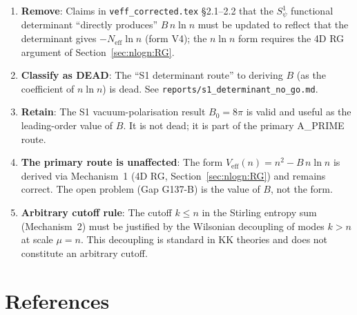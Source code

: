 \documentclass[12pt,a4paper]{article}
\theoremstyle{definition}
\theoremstyle{remark}
\newcommand{\Neff}{N_{\mathrm{eff}}}
\begin{document}
\begin{enumerate}
  \item \textbf{Remove}: Claims in \texttt{veff\_corrected.tex} \S2.1--2.2
        that the $S^1_\psi$ functional determinant ``directly produces''
        $B\,n\ln n$ must be updated to reflect that the determinant gives
        $-\Neff\ln n$ (form V4); the $n\ln n$ form requires the 4D RG
        argument of Section~\ref{sec:nlogn:RG}.

  \item \textbf{Classify as DEAD}: The ``S1 determinant route'' to deriving
        $B$ (as the coefficient of $n\ln n$) is dead.  See
        \texttt{reports/s1\_determinant\_no\_go.md}.

  \item \textbf{Retain}: The S1 vacuum-polarisation result $B_0 = 8\pi$ is
        valid and useful as the leading-order value of $B$.  It is not dead;
        it is part of the primary A\_PRIME route.

  \item \textbf{The primary route is unaffected}: The form
        $V_\mathrm{eff}(n) = n^2 - B\,n\ln n$ is derived via Mechanism~1
        (4D RG, Section~\ref{sec:nlogn:RG}) and remains correct.
        The open problem (Gap G137-B) is the value of $B$, not the form.

  \item \textbf{Arbitrary cutoff rule}: The cutoff $k \le n$ in the Stirling
        entropy sum (Mechanism~2) must be justified by the Wilsonian decoupling
        of modes $k > n$ at scale $\mu = n$.  This decoupling is standard in
        KK theories and does not constitute an arbitrary cutoff.
\end{enumerate}

\section{References}
\label{sec:nlogn:refs}
\end{document}
